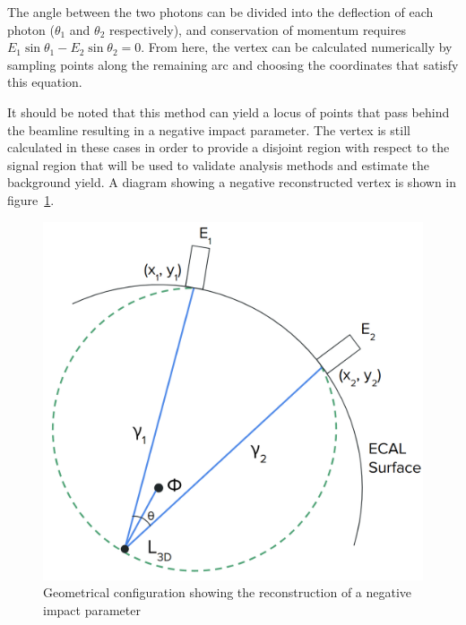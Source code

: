 The angle between the two photons can be divided into the deflection of each photon ($\theta_1$ and $\theta_2$ respectively), and conservation of momentum requires $E_1\sin{\theta_1}-E_2\sin{\theta_2}=0$. From here, the vertex can be calculated numerically by sampling points along the remaining arc and choosing the coordinates that satisfy this equation.

It should be noted that this method can yield a locus of points that pass behind the beamline resulting in a negative impact parameter. The vertex is still calculated in these cases in order to provide a disjoint region with respect to the signal region that will be used to validate analysis methods and estimate the background yield. A diagram showing a negative reconstructed vertex is shown in figure~\ref{fig:negLxy}.

\begin{figure}[htb]
	\centering
	\includegraphics[width=0.65\linewidth]{figs/05_analysis/vertexfit_diagram_negativeLxy.png}
	\caption{Geometrical configuration showing the reconstruction of a negative impact parameter}
	\label{fig:negLxy}
\end{figure}

